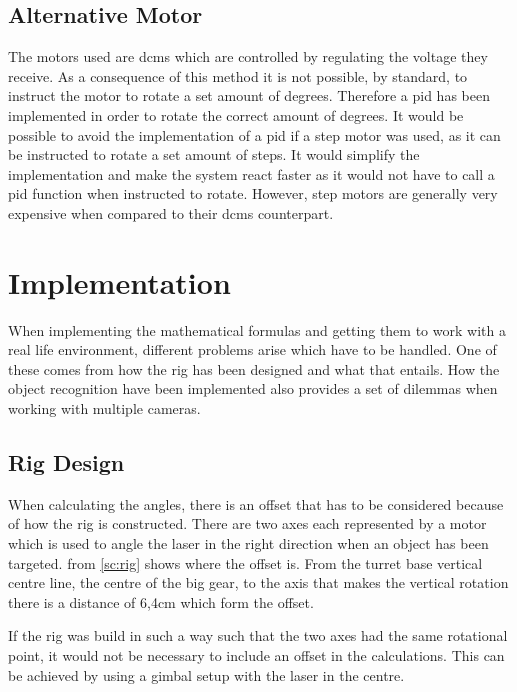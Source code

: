\subsection{Alternative Motor}\label{subsec:disc_step}
The motors used are \glspl{dcm} which are controlled by regulating the voltage they receive. As a consequence of this method it is not possible, by standard, to instruct the motor to rotate a set amount of degrees. Therefore a \gls{pid} has been implemented in order to rotate the correct amount of degrees. It would be possible to avoid the implementation of a \gls{pid} if a step motor was used, as it can be instructed to rotate a set amount of steps. It would simplify the implementation and make the system react faster as it would not have to call a \gls{pid} function when instructed to rotate. However, step motors are generally very expensive when compared to their \glspl{dcm} counterpart. 

\section{Implementation}\label{sec:disc_implementation}
When implementing the mathematical formulas and getting them to work with a real life environment, different problems arise which have to be handled. One of these comes from how the rig has been designed and what that entails. How the object recognition have been implemented also provides a set of dilemmas when working with multiple cameras.

\subsection{Rig Design}\label{subsec:disc_rig}
When calculating the angles, there is an offset that has to be considered because of how the rig is constructed. There are two axes each represented by a motor which is used to angle the laser in the right direction when an object has been targeted.  from \cref{sc:rig} shows where the offset is. From the turret base vertical centre line, the centre of the big gear, to the axis that makes the vertical rotation there is a distance of 6,4cm which form the offset.

If the rig was build in such a way such that the two axes had the same rotational point, it would not be necessary to include an offset in the calculations. This can be achieved by using a gimbal setup with the laser in the centre.

